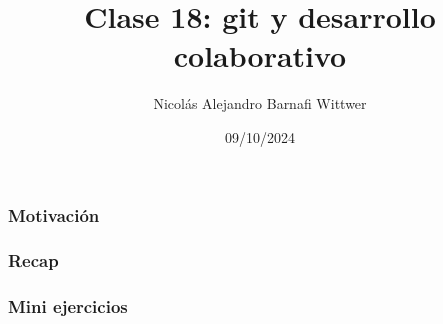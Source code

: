 \documentclass[14pt,aspectratio=169,xcolor=dvipsnames]{beamer}
\title[short title]{Clase 18: git y desarrollo colaborativo}
\subtitle{}
\author[NA Barnafi] {Nicolás Alejandro Barnafi Wittwer}
\institute[UC|CMM] 
{
    Pontificia Universidad Católica de Chile \\
    Centro de Modelamiento Matemático
}
\date{09/10/2024}
\begin{document}
\begin{frame}
    \maketitle
\end{frame}
\begin{frame}\frametitle{Motivación}
\end{frame}
\begin{frame}\frametitle{Recap}
\end{frame}
\begin{frame}
    \maketitle
\end{frame}
\begin{frame}[noframenumbering]\frametitle{Mini ejercicios}
\end{frame}
\end{document}
